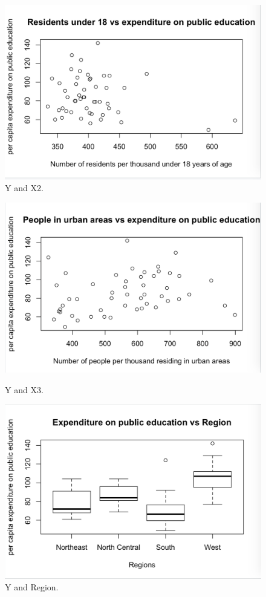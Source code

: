 \documentclass[12pt,letterpaper]{article}
\begin{document}
\begin{itemize}
\begin{figure}
								
			\includegraphics[width=\linewidth]{YX2}
			\caption{Y and X2.}
			\label{fig:YX2}
		\end{figure}	
		
		\begin{figure}	
			\includegraphics[width=\linewidth]{YX3}
			\caption{Y and X3.}
			\label{fig:YX3}
			
			
			\includegraphics[width=\linewidth]{YRegion}
			\caption{Y and Region.}
			\label{fig:YRegion}
		\end{figure}	
		

\end{itemize}
\end{document}
